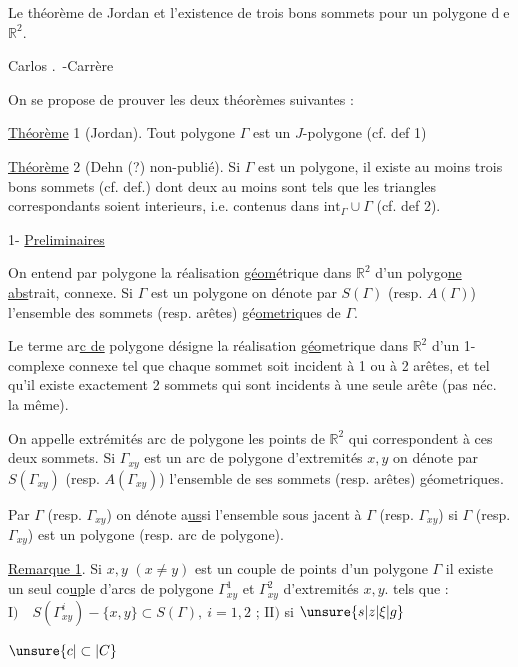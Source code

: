 Le théorème de Jordan et l'existence de trois bons sommets pour un polygone \textcircled{de $\mathbb{R}^{2}$.}

\hspace*{\fill}Carlos .~-Carrère\hspace*{\fill}

\margin{$\bullet$}On se propose de prouver les deux théorèmes suivantes :

\uline{Théorème} 1 (Jordan). Tout polygone $\Gamma$ est un $J$-polygone (cf. def 1)

\uline{Théorème} 2 (Dehn (?) non-publié). Si $\Gamma$ est un polygone, il existe au moins trois bons sommets (cf. def.\hspace{1em}) dont deux au moins sont tels que les triangles correspondants soient interieurs, i.e. contenus dans $\mathrm{int}_{\Gamma}\cup\Gamma$ (cf. def 2).

1- \uline{Preliminaires}

\margin{$\bullet\ \bullet$}On entend par polygone la réalisation \uline{géom}étrique dans \uline{$\mathbb{R}^{2}$} d'un \margin{$\bullet$}polygo\uline{ne abs}trait, connexe. Si $\Gamma$ est un polygone on dénote par \margin{$\bullet$}$S(\Gamma)$ (resp. $A(\Gamma)$) l'ensemble des sommets (resp. arêtes) gé\uline{ometriq}ues de $\Gamma$.

\margin{$\cdot\quad\cdot$}Le terme ar\uline{c de} polygone désigne la réalisation \uline{géo}metrique dans $\mathbb{R}^{2}$ d'un 1-complexe connexe\inserted{[} tel que chaque sommet soit incident à 1 ou à 2 arêtes, et tel qu'il existe exactement 2 sommets qui sont incidents à une seule arête (pas néc. la même).

On appelle extrémités  arc de polygone les points de $\mathbb{R}^{2}$ qui correspondent à ces deux sommets. Si $\Gamma_{xy}$ est un arc de polygone d'extremités $x,y$ on dénote par $S(\Gamma_{xy})$ (resp. $A(\Gamma_{xy})$) l'ensemble de ses sommets (resp. arêtes) géometriques.

\margin{$\bullet$}Par $\Gamma$ (resp. $\Gamma_{xy}$) on dénote a\uline{us}si l'ensemble  sous jacent à $\Gamma$ (resp. $\Gamma_{xy}$) si $\Gamma$  (resp. $\Gamma_{xy}$) est un polygone (resp. arc de polygone).

\textcircled{\uline{Remarque 1}}. Si $x,y$ $(x\ne y)$ est un couple de points d'un polygone $\Gamma$ il existe \margin{$\cdot$}un seul co\uline{up}le d'arcs de polygone $\Gamma^{1}_{xy}$ et $\Gamma^{2}_{xy}$ d'extremités $x,y$. tels que : $\mathrm{I})\quad S(\Gamma^{i}_{xy})-\{x,y\}\subset S(\Gamma),\ i=1,2$ ; $\mathrm{II})$ si $\unsure{s|z|\xi|g}$ 
\par\noindent$\unsure{c|\subset|C}$
